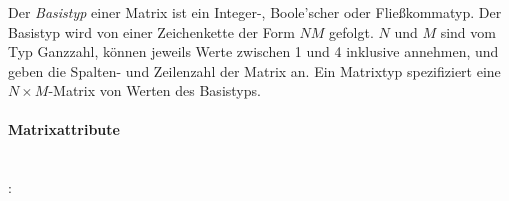 \hspace*{1cm}\glq{}\grq \\
\hspace*{1cm}\glq{}\grq \\
\hspace*{1cm}\glq{}\grq \\
\hspace*{1cm}\glq{}\grq \\
\hspace*{1cm}\glq{}\grq \\
\hspace*{1cm}\glq{}\grq \\
\hspace*{1cm}\glq{}\grq \\
\hspace*{1cm}\glq{}\grq \\
\hspace*{1cm}\glq{}\grq \\
\hspace*{1cm}\glq{}\grq \\
\hspace*{1cm}\glq{}\grq \\
\hspace*{1cm}\glq{}\grq \\
\hspace*{1cm}\glq{}\grq \\
\hspace*{1cm}\glq{}\grq \\
\hspace*{1cm}\glq{}\grq \\

Der \emph{Basistyp} einer Matrix ist ein Integer-, Boole'scher oder Fließkommatyp.
Der Basistyp wird von einer Zeichenkette der Form $N$$M$ gefolgt. $N$ und
$M$ sind vom Typ Ganzzahl, können jeweils Werte zwischen 1 und 4 inklusive annehmen,
und geben die Spalten- und Zeilenzahl
der Matrix an. Ein Matrixtyp spezifiziert eine  $N \times M$-Matrix von Werten des Basistyps.

\paragraph{Matrixattribute}\label{Matrixattribute}
~\\
:\label{attr_matrix}\\
\hspace*{1cm}\glq{}\grq \\
\hspace*{1cm}\glq{}\grq \\
\hspace*{1cm}\glq{}\grq \\
\hspace*{1cm}\glq{}\grq \\

